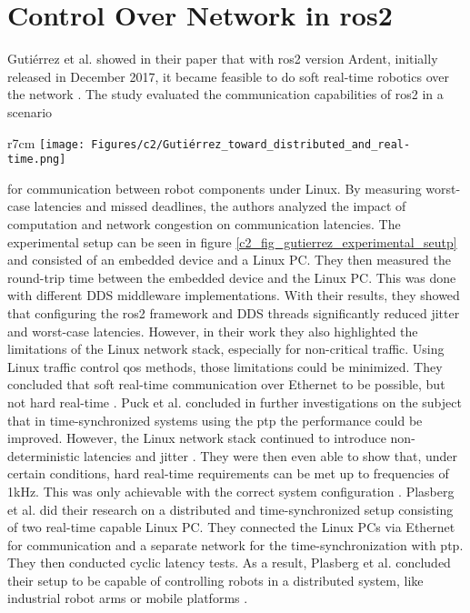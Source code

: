 \section{Control Over Network in \gls{ros2}}\label{c2_sec_control_over_network}
Gutiérrez et al. showed in their paper that with \gls{ros2} version Ardent, initially released in December 2017, it became feasible to do soft real-time robotics over the network \cite{gutierrez_towards_2018}. The study evaluated the communication capabilities of \gls{ros2} in a scenario
\begin{wrapfigure}{r}{7cm}
\texttt{[image: Figures/c2/Gutiérrez\_toward\_distributed\_and\_real-time.png]}
\caption{The experimental setup used by Gutiérrez et al. to evaluate the real-time performance of \gls{ros2} communication over Ethernet. Figure taken from \cite{gutierrez_towards_2018}.} \label{c2_fig_gutierrez_experimental_seutp}
\end{wrapfigure}
for communication between robot components under Linux. By measuring worst-case latencies and missed deadlines, the authors analyzed the impact of computation and network congestion on communication latencies. The experimental setup can be seen in figure \ref{c2_fig_gutierrez_experimental_seutp} and consisted of an embedded device and a Linux PC. They then measured the round-trip time between the embedded device and the Linux PC. This was done with different DDS middleware implementations. With their results, they showed that configuring the \gls{ros2} framework and DDS threads significantly reduced jitter and worst-case latencies. However, in their work they also highlighted the limitations of the Linux network stack, especially for non-critical traffic. Using Linux traffic control \gls{qos} methods, those limitations could be minimized. They concluded that soft real-time communication over Ethernet to be possible, but not hard real-time \cite{gutierrez_towards_2018}. \newline
Puck et al. concluded in further investigations on the subject that in time-synchronized systems using the \gls{ptp} the performance could be improved. However, the Linux network stack continued to introduce non-deterministic latencies and jitter \cite{puck_distributed_2020}. They were then even able to show that, under certain conditions, hard real-time requirements can be met up to frequencies of 1kHz. This was only achievable with the correct system configuration \cite{puck_performance_2021}.\newline
Plasberg et al. did their research on a distributed and time-synchronized setup consisting of two real-time capable Linux PC. They connected the Linux PCs via Ethernet for communication and a separate network for the time-synchronization with \gls{ptp}. They then conducted cyclic latency tests. As a result, Plasberg et al. concluded their setup to be capable of controlling robots in a distributed system, like industrial robot arms or mobile platforms \cite{plasberg_towards_2022}.

